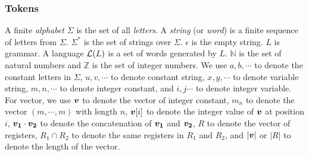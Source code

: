 %

\subsubsection{Tokens}
A finite \emph{alphabet} $\Sigma$ is the set of all \emph{letters}. A
\emph{string} (or \emph{word}) is a finite sequence of letters from $\Sigma$. $\Sigma^*$ is the set of strings over $\Sigma$. $\epsilon$ is the empty string. $L$ is grammar. A language $\mathcal{L}(L)$ is a set of words generated by $L$. $\mathbb{N}$ is the set of natural numbers and $\mathbb{Z}$ is the set of integer numbers. We use $a,
  b,\cdots$ to denote the constant letters in $\Sigma$, $u, v,\cdots$ to denote constant
string, $x, y,\cdots$ to denote variable string, $m,n,\cdots$ to
denote integer constant, and $i,j\cdots$ to denote integer variable. For vector, we use $\myvec{v}$ to denote the vector of integer constant, $m_n$ to denote the vector $(m,\cdots, m)$ with length $n$, $\myvec{v}[i]$ to denote the integer value of $\myvec{v}$ at position $i$, $\myvec{v_1}\cdot\myvec{v_2}$ to denote the concatenation of $\myvec{v_1}$ and $\myvec{v_2}$, $R$ to denote the vector of registers, $R_1 \cap R_2$ to denote the same registers in $R_1$ and $R_2$, and $|\myvec{v}|$ or $|R|$ to denote the length of the vector.


